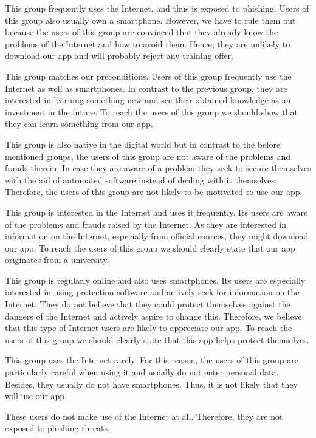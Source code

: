 \begin{description}[leftmargin=0cm]
\item[Digital Souver\"{a}ne:] This group frequently uses the Internet, and thus is exposed to phishing. Users of this group also usually own a smartphone. However, we have to rule them out because the users of this group are convinced that they already know the problems of the Internet and how to avoid them. Hence, they are unlikely to download our app and  will probably reject any training offer.
\item[Effizienzorientierte Performer:] This group matches our preconditions.
Users of this group frequently use the Internet as well as smartphones. In contrast to the previous group, they are interested in learning something new and see their obtained knowledge as an investment in the future. To reach the users of this group we should show that they can learn something from our app.
\item[Unbek\"{u}mmerte Hedonisten:] This group is also native in the digital world but in contrast to the before mentioned groups, the users of this group are not aware of the problems and frauds therein. In case they are aware of a problem they seek to secure themselves with the aid of automated software instead of dealing with it themselves. Therefore, the users of this group are not likely to be motivated to use our app.
\item[Postmaterielle Skeptiker:] This group is interested in the Internet and uses it frequently. Its users are aware of the problems and frauds raised by the Internet. As they are interested in information on the Internet, especially from official sources, they might download our app. To reach the users of this group we should clearly state that our app originates from a university.
\item[Verantwortungsbedachte Etablierte:] This group is regularly online and also uses smartphones. Its users are especially interested in using protection software and actively seek for information on the Internet. They do not believe that they could protect themselves against the dangers of the Internet and actively aspire to change this. Therefore, we believe that this type of Internet users are likely to appreciate our app. To reach the users of this group we should clearly state that this app helps protect themselves.
\item[Ordnungsfordernde Internet-Laien:] This group uses the Internet rarely. For this reason, the users of this group are particularly careful when using it and usually do not enter personal data. Besides, they usually do not have smartphones. Thus, it is not likely that they will use our app. 
\item[Internetferne Verunsicherte:] These users do not make use of the Internet at all. Therefore, they are not exposed to phishing threats.
\end{description}
